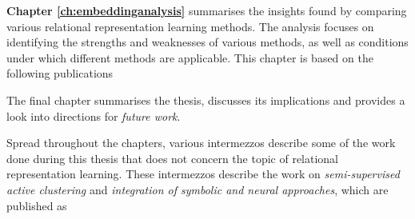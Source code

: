 \begin{quote}
\end{quote}


\textbf{Chapter \ref{ch:embeddinganalysis}} summarises the insights found by comparing various relational representation learning methods.
The analysis focuses on identifying the strengths and weaknesses of various methods, as well as conditions under which different methods are applicable.
This chapter is based on the following publications

\begin{quote}
\end{quote}

\begin{quote}
\end{quote}

\begin{quote}
\end{quote}


The final chapter summarises the thesis, discusses its implications and provides a look into directions for \textit{future work}.

Spread throughout the chapters, various intermezzos describe some of the work done during this thesis that does not concern the topic of relational representation learning.
These intermezzos describe the work on \textit{semi-supervised active clustering} and \textit{integration of symbolic and neural approaches}, which are published as

\begin{quote}
\end{quote}

\begin{quote}
\end{quote}

\begin{quote}
\end{quote}

\begin{quote}
\end{quote}






\cleardoublepage


